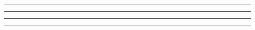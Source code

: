 \begin{problem}{11.5}

\end{problem}
\begin{solution}

\end{solution}

\noindent\rule{7in}{1.5pt}


\begin{problem}{11.6}

\end{problem}
\begin{solution}

\end{solution}

\noindent\rule{7in}{1.5pt}


\begin{problem}{11.7}

\end{problem}
\begin{solution}

\end{solution}

\noindent\rule{7in}{1.5pt}


\begin{problem}{11.8}

\end{problem}
\begin{solution}

\end{solution}

\noindent\rule{7in}{1.5pt}


\begin{problem}{11.9}

\end{problem}
\begin{solution}

\end{solution}

